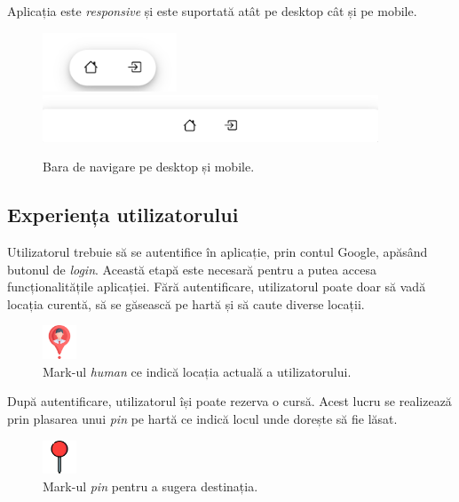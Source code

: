 Aplicația este \textit{responsive} și este suportată atât pe desktop cât și pe mobile.

\begin{figure}[H]
    \centering
    \includegraphics[width=4cm]{Assets/responsive1.png}
    \includegraphics[width=10cm]{Assets/responsive2.png}
    \caption{Bara de navigare pe desktop și mobile.}
    \label{fig:responsive}
\end{figure}

\subsection{Experiența utilizatorului}

Utilizatorul trebuie să se autentifice în aplicație, prin contul Google, apăsând butonul de \textit{login}. 
Această etapă este necesară pentru a putea accesa funcționalitățile aplicației.
Fără autentificare, utilizatorul poate doar să vadă locația curentă, să se găsească pe hartă și să
caute diverse locații.

\begin{figure}[H]
    \centering
    \includegraphics[width=1cm]{Assets/human.png}
    \caption{Mark-ul \textit{human} ce indică locația actuală a utilizatorului.}
    \label{fig:human}
\end{figure}

După autentificare, utilizatorul își poate rezerva o cursă. Acest lucru se realizează prin
plasarea unui \textit{pin} pe hartă ce indică locul unde dorește să fie lăsat.

\begin{figure}[H]
    \centering
    \includegraphics[width=1cm]{Assets/pin.png}
    \caption{Mark-ul \textit{pin} pentru a sugera destinația.}
    \label{fig:pin}
\end{figure}

